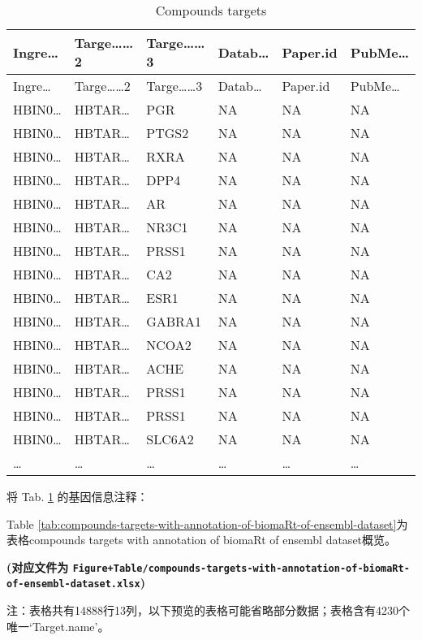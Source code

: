 \documentclass[
]{article}
\begin{document}
\begin{longtable}[]{@{}llllll@{}}
\caption{\label{tab:compounds-targets}Compounds targets}\tabularnewline
\toprule
Ingre\ldots{} & Targe\ldots\ldots2 & Targe\ldots\ldots3 & Datab\ldots{} & Paper.id & PubMe\ldots{}\tabularnewline
\midrule
\endfirsthead
\toprule
Ingre\ldots{} & Targe\ldots\ldots2 & Targe\ldots\ldots3 & Datab\ldots{} & Paper.id & PubMe\ldots{}\tabularnewline
\midrule
\endhead
HBIN0\ldots{} & HBTAR\ldots{} & PGR & NA & NA & NA\tabularnewline
HBIN0\ldots{} & HBTAR\ldots{} & PTGS2 & NA & NA & NA\tabularnewline
HBIN0\ldots{} & HBTAR\ldots{} & RXRA & NA & NA & NA\tabularnewline
HBIN0\ldots{} & HBTAR\ldots{} & DPP4 & NA & NA & NA\tabularnewline
HBIN0\ldots{} & HBTAR\ldots{} & AR & NA & NA & NA\tabularnewline
HBIN0\ldots{} & HBTAR\ldots{} & NR3C1 & NA & NA & NA\tabularnewline
HBIN0\ldots{} & HBTAR\ldots{} & PRSS1 & NA & NA & NA\tabularnewline
HBIN0\ldots{} & HBTAR\ldots{} & CA2 & NA & NA & NA\tabularnewline
HBIN0\ldots{} & HBTAR\ldots{} & ESR1 & NA & NA & NA\tabularnewline
HBIN0\ldots{} & HBTAR\ldots{} & GABRA1 & NA & NA & NA\tabularnewline
HBIN0\ldots{} & HBTAR\ldots{} & NCOA2 & NA & NA & NA\tabularnewline
HBIN0\ldots{} & HBTAR\ldots{} & ACHE & NA & NA & NA\tabularnewline
HBIN0\ldots{} & HBTAR\ldots{} & PRSS1 & NA & NA & NA\tabularnewline
HBIN0\ldots{} & HBTAR\ldots{} & PRSS1 & NA & NA & NA\tabularnewline
HBIN0\ldots{} & HBTAR\ldots{} & SLC6A2 & NA & NA & NA\tabularnewline
\ldots{} & \ldots{} & \ldots{} & \ldots{} & \ldots{} & \ldots{}\tabularnewline
\bottomrule
\end{longtable}

将 Tab. \ref{tab:compounds-targets} 的基因信息注释：

Table \ref{tab:compounds-targets-with-annotation-of-biomaRt-of-ensembl-dataset}为表格compounds targets with annotation of biomaRt of ensembl dataset概览。

\textbf{(对应文件为 \texttt{Figure+Table/compounds-targets-with-annotation-of-biomaRt-of-ensembl-dataset.xlsx})}

\begin{center}\begin{tcolorbox}[colback=gray!10, colframe=gray!50, width=0.9\linewidth, arc=1mm, boxrule=0.5pt]注：表格共有14888行13列，以下预览的表格可能省略部分数据；表格含有4230个唯一`Target.name'。
\end{tcolorbox}
\end{center}
\end{document}
